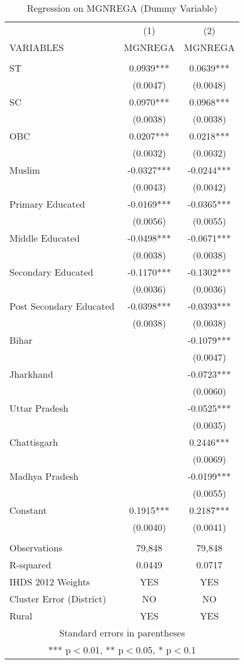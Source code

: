 \documentclass{article}
\begin{document}
\begin{table}[]
\small
    \centering
    \begin{tabular}{lcc} \hline
 & (1) & (2) \\
VARIABLES & MGNREGA & MGNREGA \\ \hline \hline
 &  &  \\
ST & 0.0939*** & 0.0639*** \\
 & (0.0047) & (0.0048) \\
SC & 0.0970*** & 0.0968*** \\
 & (0.0038) & (0.0038) \\
OBC & 0.0207*** & 0.0218*** \\
 & (0.0032) & (0.0032) \\
Muslim & -0.0327*** & -0.0244*** \\
 & (0.0043) & (0.0042) \\
Primary Educated & -0.0169*** & -0.0365*** \\
 & (0.0056) & (0.0055) \\
Middle Educated & -0.0498*** & -0.0671*** \\
 & (0.0038) & (0.0038) \\
Secondary Educated & -0.1170*** & -0.1302*** \\
 & (0.0036) & (0.0036) \\
Post Secondary Educated & -0.0398*** & -0.0393*** \\
 & (0.0038) & (0.0038) \\
Bihar &  & -0.1079*** \\
 &  & (0.0047) \\
Jharkhand &  & -0.0723*** \\
 &  & (0.0060) \\
Uttar Pradesh &  & -0.0525*** \\
 &  & (0.0035) \\
Chattisgarh &  & 0.2446*** \\
 &  & (0.0069) \\
Madhya Pradesh &  & -0.0199*** \\
 &  & (0.0055) \\
Constant & 0.1915*** & 0.2187*** \\
 & (0.0040) & (0.0041) \\
 &  &  \\\hline
Observations & 79,848 & 79,848 \\
 R-squared & 0.0449 & 0.0717 \\ 
  IHDS 2012 Weights & YES & YES\\
Cluster Error (District) & NO & NO\\
Rural & YES & YES\\\hline
\multicolumn{3}{c}{ Standard errors in parentheses} \\
\multicolumn{3}{c}{ *** p$<$0.01, ** p$<$0.05, * p$<$0.1} \\\hline
\end{tabular}
    \caption{Regression on MGNREGA (Dummy Variable) }
    \label{tab9}
\end{table}
\end{document}
